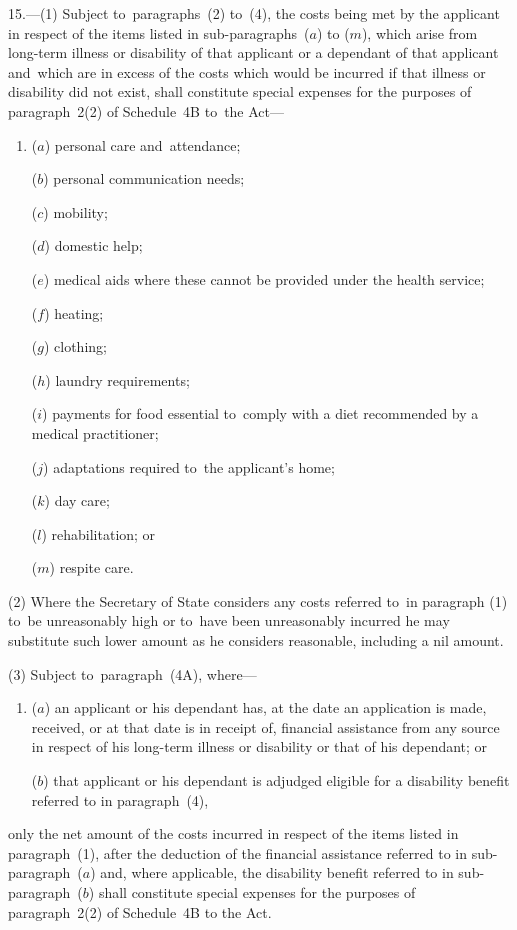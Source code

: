 \documentclass[12pt,a4paper]{article}
\begin{document}
15.—(1) Subject to~paragraphs~(2) to~(4), the costs being
met by the applicant in respect of the items listed in sub-paragraphs~($a$) to
($m$), which arise from long-term illness or disability of that applicant or a
dependant of that applicant and~which are in excess of the costs which would be
incurred if that illness or disability did not exist, shall constitute special
expenses for the purposes of paragraph~2(2) of Schedule~4B to~the Act—
\begin{enumerate}\item[]
($a$) personal care and~attendance;

($b$) personal communication needs;

($c$) mobility;

($d$) domestic help;

($e$) medical aids where these cannot be provided under the health service;

($f$) heating;

($g$) clothing;

($h$) laundry requirements;

($i$) payments for food essential to~comply with a diet recommended by a medical
practitioner;

($j$) adaptations required to~the applicant’s home;

($k$) day care;

($l$) rehabilitation; or

($m$) respite care.
\end{enumerate}

(2) Where the Secretary of State considers any costs referred to~in paragraph
(1) to~be unreasonably high or to~have been unreasonably incurred he may
substitute such lower amount as he considers reasonable, including a nil amount.

(3) 
Subject to~paragraph~(4A),  %
where—
\begin{enumerate}\item[]
($a$) an applicant or his dependant has, at the date an application is made,
received, or at that date is in receipt of, financial assistance from any source
in respect of his long-term illness or disability or that of his dependant; or

($b$) that applicant or his dependant is adjudged eligible for 
a disability benefit  %
referred to in paragraph~(4),
\end{enumerate}
only the net amount of the costs incurred in respect of the items listed in paragraph~(1), after the deduction of the financial assistance referred to in sub-paragraph~($a$) and, where applicable, 
the disability benefit  %
referred to in sub-paragraph~($b$) shall constitute special expenses for the purposes of paragraph~2(2) of Schedule~4B to the Act.
\end{document}
